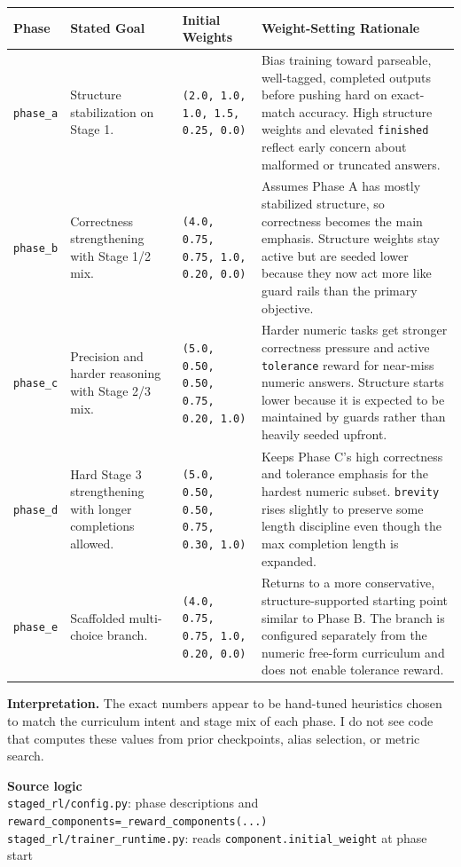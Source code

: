 \documentclass[11pt]{article}
\newcommand{\code}[1]{\texttt{#1}}
\begin{document}
\vspace{0.4em}
\renewcommand{\arraystretch}{1.12}
\setlength{\tabcolsep}{4pt}
\scriptsize
\begin{center}
\begin{tabular}{L{0.07\textwidth} L{0.22\textwidth} L{0.17\textwidth} L{0.43\textwidth}}
\toprule
\textbf{Phase} &
\textbf{Stated Goal} &
\textbf{Initial Weights} &
\textbf{Weight-Setting Rationale} \\
\midrule
\code{phase\_a} &
Structure stabilization on Stage 1. &
\code{(2.0, 1.0, 1.0, 1.5, 0.25, 0.0)} &
Bias training toward parseable, well-tagged, completed outputs before pushing hard on exact-match accuracy. High structure weights and elevated \code{finished} reflect early concern about malformed or truncated answers. \\

\code{phase\_b} &
Correctness strengthening with Stage 1/2 mix. &
\code{(4.0, 0.75, 0.75, 1.0, 0.20, 0.0)} &
Assumes Phase A has mostly stabilized structure, so correctness becomes the main emphasis. Structure weights stay active but are seeded lower because they now act more like guard rails than the primary objective. \\

\code{phase\_c} &
Precision and harder reasoning with Stage 2/3 mix. &
\code{(5.0, 0.50, 0.50, 0.75, 0.20, 1.0)} &
Harder numeric tasks get stronger correctness pressure and active \code{tolerance} reward for near-miss numeric answers. Structure starts lower because it is expected to be maintained by guards rather than heavily seeded upfront. \\

\code{phase\_d} &
Hard Stage 3 strengthening with longer completions allowed. &
\code{(5.0, 0.50, 0.50, 0.75, 0.30, 1.0)} &
Keeps Phase C's high correctness and tolerance emphasis for the hardest numeric subset. \code{brevity} rises slightly to preserve some length discipline even though the max completion length is expanded. \\

\code{phase\_e} &
Scaffolded multi-choice branch. &
\code{(4.0, 0.75, 0.75, 1.0, 0.20, 0.0)} &
Returns to a more conservative, structure-supported starting point similar to Phase B. The branch is configured separately from the numeric free-form curriculum and does not enable tolerance reward. \\
\bottomrule
\end{tabular}
\end{center}

\vspace{0.4em}
\noindent\textbf{Interpretation.}
The exact numbers appear to be hand-tuned heuristics chosen to match the curriculum intent and stage mix of each phase.
I do not see code that computes these values from prior checkpoints, alias selection, or metric search.

\vspace{0.4em}
\noindent\textbf{Source logic}\\
\code{staged\_rl/config.py}: phase descriptions and \code{reward\_components=\_reward\_components(...)}\\
\code{staged\_rl/trainer\_runtime.py}: reads \code{component.initial\_weight} at phase start
\end{document}
